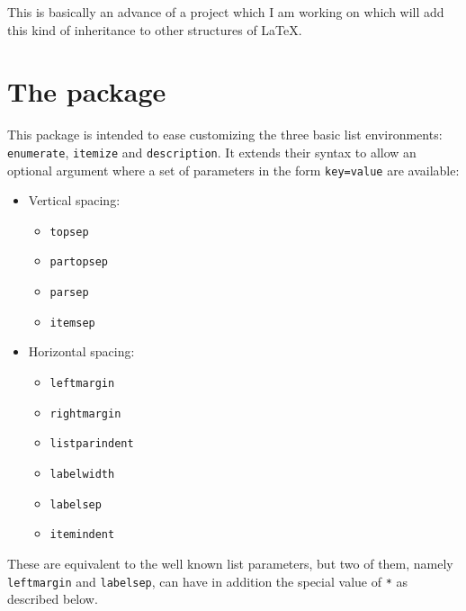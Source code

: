 \documentclass{article}
\begin{document}
This is basically an advance of a project which I am working
on which will add this kind of inheritance to other structures
of \LaTeX{}.

\section{The package}

This package is intended to ease customizing the three
basic list environments: \verb|enumerate|, \verb|itemize| and
\verb|description|. It extends their syntax to allow
an optional argument where a set of parameters in the
form \verb|key=value| are available:
\begin{itemize}
\item
Vertical spacing:
\begin{itemize}
\item \verb|topsep|
\item \verb|partopsep|
\item \verb|parsep|
\item \verb|itemsep|
\end{itemize}
\item
Horizontal spacing:
\begin{itemize}
\item \verb|leftmargin|
\item \verb|rightmargin|
\item \verb|listparindent|
\item \verb|labelwidth|
\item \verb|labelsep|
\item \verb|itemindent|
\end{itemize}
\end{itemize}

These are equivalent to the well known list parameters, but
two of them, namely \verb|leftmargin| and \verb|labelsep|,
can have in addition the special value of \verb|*| as
described below. 
\end{document}
